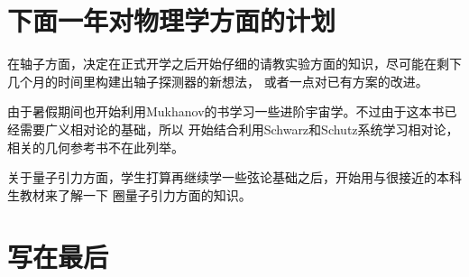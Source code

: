 \documentclass[10pt,a4paper]{article}
\begin{document}
\begin{spacing}{1.6}
\section{下面一年对物理学方面的计划}
在轴子方面，决定在正式开学之后开始仔细的请教实验方面的知识，尽可能在剩下几个月的时间里构建出轴子探测器的新想法，
或者一点对已有方案的改进。\par
由于暑假期间也开始利用Mukhanov的书\cite{mukh-pf}学习一些进阶宇宙学。不过由于这本书已经需要广义相对论的基础，所以
开始结合利用Schwarz\cite{schw-sr}和Schutz\cite{schu-gr}系统学习相对论，相关的几何参考书不在此列举。\par
关于量子引力方面，学生打算再继续学一些弦论基础之后，开始用与\cite{zwie-st}很接近的本科生教材\cite{gamb-lg}来了解一下
圈量子引力方面的知识。

\section{写在最后}

\end{spacing}
\end{document}
